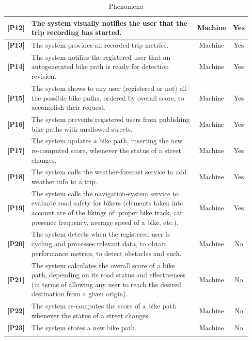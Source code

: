 \documentclass{Configuration_Files/PoliMi3i_thesis}
\begin{document}
\begin{center}
\begin{longtable}{|c|p{7cm}|c|c|}
        \textbf{[P12]} & The system visually notifies the user that the trip recording has started. & Machine & Yes \\ \hline
        \textbf{[P13]} & The system provides all recorded trip metrics. & Machine & Yes \\ \hline
        \textbf{[P14]} & The system notifies the registered user that an autogenerated bike path is ready for detection revision. & Machine & Yes \\ \hline
        \textbf{[P15]} & The system shows to any user (registered or not) all the possible bike paths, ordered by overall score, to accomplish their request. & Machine & Yes \\ \hline
        \textbf{[P16]} & The system prevents registered users from publishing bike paths with unallowed streets. & Machine & Yes \\ \hline
        \textbf{[P17]} & The system updates a bike path, inserting the new re-computed score, whenever the status of a street changes. & Machine & Yes \\ \hline
        \textbf{[P18]} & The system calls the weather-forecast service to add weather info to a trip. & Machine & Yes \\ \hline
        \textbf{[P19]} & The system calls the navigation-system service to evaluate road safety for bikers (elements taken into account are of the likings of: proper bike track, car presence frequency, average speed of a bike, etc.). & Machine & Yes \\ \hline
        
        \textbf{[P20]} & The system detects when the registered user is cycling and processes relevant data, to obtain performance metrics, to detect obstacles and such. & Machine & No \\ \hline
        \textbf{[P21]} & The system calculates the overall score of a bike path, depending on its road status and effectiveness (in terms of allowing any user to reach the desired destination from a given origin). & Machine & No \\ \hline
        \textbf{[P22]} & The system re-computes the score of a bike path whenever the status of a street changes. & Machine & No \\ \hline
        \textbf{[P23]} & The system stores a new bike path. & Machine & No \\ \hline
        
    \caption{Phenomena}
    \end{longtable}
\end{center}
\end{document}
